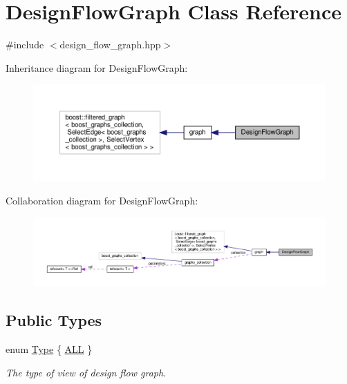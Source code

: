 \hypertarget{classDesignFlowGraph}{}\section{Design\+Flow\+Graph Class Reference}
\label{classDesignFlowGraph}


{\ttfamily \#include $<$design\+\_\+flow\+\_\+graph.\+hpp$>$}



Inheritance diagram for Design\+Flow\+Graph\+:
\nopagebreak
\begin{figure}[H]
\begin{center}
\leavevmode
\includegraphics[width=350pt]{d9/d23/classDesignFlowGraph__inherit__graph}
\end{center}
\end{figure}


Collaboration diagram for Design\+Flow\+Graph\+:
\nopagebreak
\begin{figure}[H]
\begin{center}
\leavevmode
\includegraphics[width=350pt]{dd/d33/classDesignFlowGraph__coll__graph}
\end{center}
\end{figure}
\subsection*{Public Types}
\begin{DoxyCompactItemize}
\item 
enum \hyperlink{classDesignFlowGraph_ab90f4a312dc3eaa9d6df290bb9b2848b}{Type} \{ \hyperlink{classDesignFlowGraph_ab90f4a312dc3eaa9d6df290bb9b2848bae151085d475a6fe91dbd592fadd70a2b}{A\+LL}
 \}\begin{DoxyCompactList}\small\item\em The type of view of design flow graph. \end{DoxyCompactList}
\end{DoxyCompactItemize}
